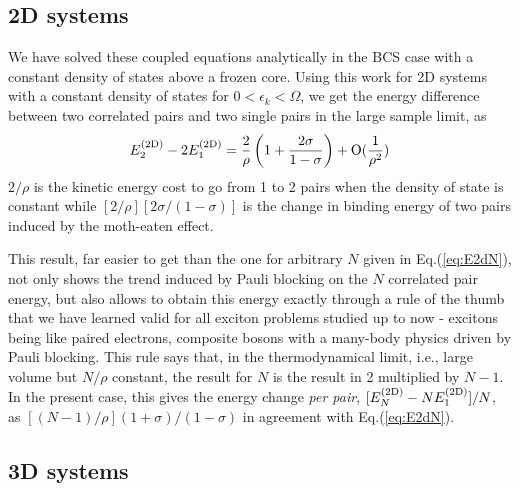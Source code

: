 \documentclass[5p,twocolumn]{elsarticle}
\begin{document}
\subsection{2D systems}
We have solved these coupled equations analytically in the BCS case with a constant density of states above a frozen core\cite{combescotBCS}.  Using  this work  for 2D systems with a constant density of states for $0<\epsilon_k<\Omega$, we get the energy difference between two correlated pairs and two single pairs in the large sample limit, as 
\begin{equation}
E^{{{\text{(2D)}}}}_2-2E_1^{{{\text{(2D)}}}}=\frac{2}{\rho}\left(1+\frac{2\sigma}{1-\sigma}\right)+\text{O}(\frac{1}{\rho^2})
\label{eq:}
\end{equation}
$2/\rho$ is the kinetic energy cost to go from 1 to 2 pairs when the density of state is constant while $[2/\rho][2\sigma/(1-\sigma)]$ is the change in binding energy of two pairs induced by the moth-eaten effect. 

This result, far easier to get than the one for arbitrary $N$ given in Eq.(\ref{eq:E2dN}), not only shows the trend induced by Pauli blocking on the $N$ correlated pair energy, but also allows to obtain this energy exactly through a rule of the thumb that we have learned valid for all exciton problems studied up to now - excitons being like paired electrons, composite bosons with a many-body physics driven by Pauli blocking.  This rule says that, in the thermodynamical limit, i.e., large volume but $N/\rho$ constant, the result for $N$ is the result in 2 multiplied by $N-1$.  In the present case, this gives the energy change \emph{per pair}, $[E^{{{\text{(2D)}}}}_N-NE^{{{\text{(2D)}}}}_1]/N$, as $[(N-1)/\rho](1+\sigma)/(1-\sigma)$ in agreement with
Eq.(\ref{eq:E2dN}).


\subsection{3D systems}
\end{document}
